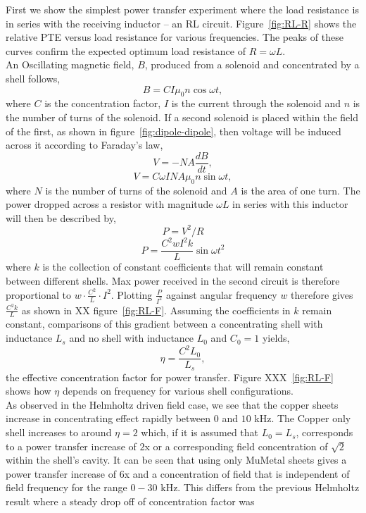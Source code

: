 \documentclass[11pt]{iopart}
\begin{document}
First we show the simplest power transfer experiment where the load
resistance is in series with the receiving inductor -- an RL
circuit. Figure~\ref{fig:RL-R} shows the relative PTE versus load
resistance for various frequencies. The peaks of these curves confirm
the expected optimum load resistance of $R = \omega L$. \\ An
Oscillating magnetic field, $B$, produced from a solenoid and
concentrated by a shell follows,
$$B = CI\mu_0n\cos{\omega t},$$
where $C$ is the concentration factor, $I$ is the current through the
solenoid and $n$ is the number of turns of the solenoid.  If a second
solenoid is placed within the field of the first, as shown in
figure~\ref{fig:dipole-dipole}, then voltage will be induced across it
according to Faraday's law,
$$V = -NA\frac{dB}{dt},$$
$$V = C\omega I NA\mu_0n\sin{\omega t},$$
where $N$ is the number of turns of the solenoid and $A$ is the area
of one turn.
The power dropped across a resistor with magnitude $\omega L$ in
series with this inductor will then be described by,
$$ P = V^2/R $$
$$ P = \frac{C^2wI^2k}{L}\sin{\omega t}^2$$
where $k$ is the collection of constant coefficients that will remain
constant between different shells.  Max power received in the second
circuit is therefore proportional to $w \cdot \frac{C^2}{L} \cdot
I^2$. Plotting $\frac{P}{I^2}$ against angular frequency $w$ therefore
gives $\frac{C^2k}{L}$ as shown in XX figure~\ref{fig:RL-F}. Assuming
the coefficients in $k$ remain constant, comparisons of this gradient
between a concentrating shell with inductance $L_s$ and no shell with
inductance $L_0$ and $C_0 = 1$ yields,
\begin{equation}
  \eta = \frac{C^2L_0}{L_s},
  \label{eqn:eta}
\end{equation}
the effective concentration factor for power transfer. Figure
XXX~\ref{fig:RL-F} shows how $\eta$ depends on frequency for various
shell configurations.\\ As observed in the Helmholtz driven field
case, we see that the copper sheets increase in concentrating effect
rapidly between $0$ and $10$ kHz. The Copper only shell increases to
around $\eta = 2$ which, if it is assumed that $L_0 = L_s$,
corresponds to a power transfer increase of $2$x or a corresponding
field concentration of $\sqrt{2}$ within the shell's cavity. It can be
seen that using only MuMetal sheets gives a power transfer increase of
$6$x and a concentration of field that is independent of field
frequency for the range $0 - 30$ kHz. This differs from the previous
Helmholtz result where a steady drop off of concentration factor was
\end{document}
